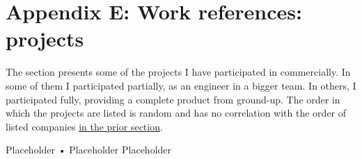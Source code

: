 \documentclass{tccv}
\begin{document}
\section{Appendix E: Work references: projects}

The section presents some of the projects I have participated in commercially. In some of them I participated partially, as an engineer in a bigger team. In others, I participated fully, providing a complete product from ground-up. The order in which the projects are listed is random and has no correlation with the order of listed companies  \hyperref[sec:clients]{in the prior section}. \\

\begin{yearlist}

\item[Placeholder]{•}
     {Placeholder}
     {Placeholder}

\end{yearlist}
\end{document}
